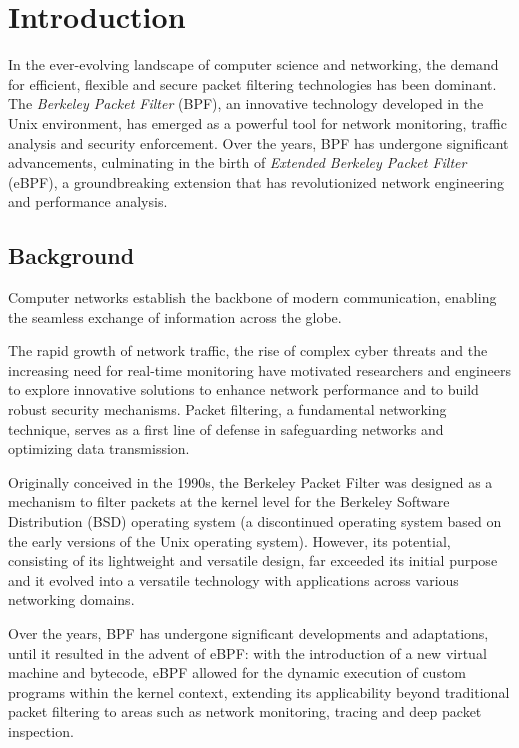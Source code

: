 \chapter{Introduction}

In the ever-evolving landscape of computer science and networking, the demand for efficient, flexible and secure packet filtering technologies has been dominant. 
The \textit{Berkeley Packet Filter} (BPF), an innovative technology developed in the Unix environment, has emerged as a powerful tool for network monitoring, traffic analysis and security enforcement. 
Over the years, BPF has undergone significant advancements, culminating in the birth of \textit{Extended Berkeley Packet Filter} (eBPF), a groundbreaking extension that has revolutionized network engineering and performance analysis.

\section{Background}

Computer networks establish the backbone of modern communication, enabling the seamless exchange of information across the globe. 

The rapid growth of network traffic, the rise of complex cyber threats and the increasing need for real-time monitoring have motivated researchers and engineers to explore innovative solutions to enhance network performance and to build robust security mechanisms.
Packet filtering, a fundamental networking technique, serves as a first line of defense in safeguarding networks and optimizing data transmission.

Originally conceived in the 1990s, the Berkeley Packet Filter was designed as a mechanism to filter packets at the kernel level for the Berkeley Software Distribution (BSD) operating system (a discontinued operating system based on the early versions of the Unix operating system). 
However, its potential, consisting of its lightweight and versatile design, far exceeded its initial purpose and it evolved into a versatile technology with applications across various networking domains.

Over the years, BPF has undergone significant developments and adaptations, until it resulted in the advent of eBPF: with the introduction of a new virtual machine and bytecode, eBPF allowed for the dynamic execution of custom programs within the kernel context, extending its applicability beyond traditional packet filtering to areas such as network monitoring, tracing and deep packet inspection.

